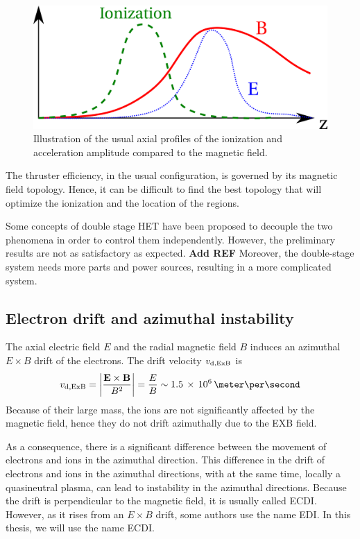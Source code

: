 \begin{figure}[hbtp]
  \centering
  \includegraphics[width=\defaultwidth]{zones}
  \caption{Illustration of the usual axial profiles of the ionization and acceleration amplitude compared to the magnetic field.}
  \label{fig-zones}
\end{figure}

The thruster efficiency, in the usual configuration, is governed by its magnetic field topology.
Hence, it can be difficult to find the best topology that will optimize the ionization and the location of the regions.

Some concepts of double stage \ac{HET} have been proposed to decouple the two phenomena in order to control them independently.
However, the preliminary results are not as satisfactory as expected. {\bf Add REF}
Moreover, the double-stage system needs more parts and power sources, resulting in a more complicated system.

\subsection{Electron drift and azimuthal instability}
The axial electric field $E$ and the radial magnetic field $B$ induces an azimuthal $E\times B$ drift of the electrons.
The drift velocity $v_{\rm d, ExB}$ is 
\begin{equation} \label{eq-}
  v_{\rm d, ExB} = \bigg\lvert \frac{\vect{E} \times \vect{B}}{B^2} \bigg\rvert = \frac{E}{B} \sim \sn{1.5}{6} \,\meter\per\second
\end{equation}
Because of their large mass, the ions are not significantly affected by the magnetic field, hence they do not drift azimuthally due to the EXB field.

As a consequence, there is a significant difference between the movement of electrons and ions in the azimuthal direction.
This difference in the drift of electrons and ions in the azimuthal directions, with at the same time, locally a quasineutral plasma, can lead to instability in the azimuthal directions.
Because the drift is perpendicular to the magnetic field, it is usually called \ac{ECDI}.
However, as it rises from an $E\times B$ drift, some authors use the name \ac{EDI}.
In this thesis, we will use the name \ac{ECDI}.

